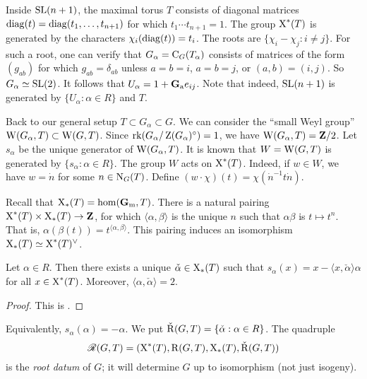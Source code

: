 \begin{example}
Inside $\operatorname{SL}(n+1)$, the maximal torus $T$ consists of diagonal matrices 
$\operatorname{diag}(t)=\operatorname{diag}(t_1,\dots,t_{n+1})$ for which 
$t_1\dotsm t_{n+1}=1$. The group $\operatorname{X}^\ast(T)$ is generated by the 
characters $\chi_i(\operatorname{diag}(t))=t_i$. The roots are 
$\{\chi_i-\chi_j:i\ne j\}$. For such a root, one can verify that 
$G_\alpha=\operatorname{C}_G(T_\alpha)$ consists of matrices of the 
form $(g_{a b})$ for which $g_{a b}=\delta_{a b}$ unless 
$a=b=i$, $a=b=j$, or $(a,b)=(i,j)$. So $G_\alpha\simeq \operatorname{SL}(2)$. 
It follows that $U_\alpha = 1+\mathbf{G}_\mathrm{a} e_{i j}$. Note that indeed, $\operatorname{SL}(n+1)$ is 
generated by $\{U_\alpha:\alpha\in R\}$ and $T$. 
\end{example}

Back to our general setup $T\subset G_\alpha\subset G$. We can consider the 
``small Weyl group'' $\operatorname{W}(G_\alpha,T)\subset \operatorname{W}(G,T)$. Since 
$\operatorname{rk}(G_\alpha/\operatorname{Z}(G_\alpha)^\circ)=1$, we have 
$\operatorname{W}(G_\alpha,T)=\mathbf{Z}/2$. Let $s_\alpha$ be the unique generator of 
$\operatorname{W}(G_\alpha,T)$. It is known that $W=\operatorname{W}(G,T)$ is generated by 
$\{s_\alpha:\alpha\in R\}$. The group $W$ acts on $\operatorname{X}^\ast(T)$. 
Indeed, if $w\in W$, we have $w=\dot n$ for some $n\in \operatorname{N}_G(T)$. 
Define $(w\cdot\chi)(t)=\chi(\dot n^{-1} t \dot n)$. 

Recall that $\operatorname{X}_\ast(T)=\hom(\mathbf{G}_\mathrm{m},T)$. There is a natural pairing 
$\operatorname{X}^\ast(T)\times \operatorname{X}_\ast(T)\to \mathbf{Z}$, for which 
$\langle \alpha,\beta\rangle$ is the unique $n$ such that $\alpha\beta$ is 
$t\mapsto t^n$. That is, $\alpha(\beta(t)) = t^{\langle\alpha,\beta\rangle}$. 
This pairing induces an isomorphism 
$\operatorname{X}_\ast(T)\simeq \operatorname{X}^\ast(T)^\vee$. 

\begin{theorem}
Let $\alpha\in R$. Then there exists a unique 
$\check\alpha\in \operatorname{X}_\ast(T)$ such that 
$s_\alpha(x) = x-\langle x,\check\alpha\rangle\alpha$ for all 
$x\in \operatorname{X}^\ast(T)$. Moreover, $\langle\alpha,\check\alpha\rangle=2$. 
\end{theorem}
\begin{proof}
This is \cite[XXII 1.1.ii]{sga3-iii}. 
\end{proof}

Equivalently, $s_\alpha(\alpha)=-\alpha$. We put 
$\check{\operatorname{R}}(G,T)=\{\check\alpha:\alpha\in R\}$. The quadruple 
\[
  \mathscr{R}(G,T) = (\operatorname{X}^\ast(T),\operatorname{R}(G,T),\operatorname{X}_\ast(T),\check {\operatorname{R}}(G,T))
\]
is the \emph{root datum} of $G$; it will determine $G$ up to isomorphism (not 
just isogeny). 

